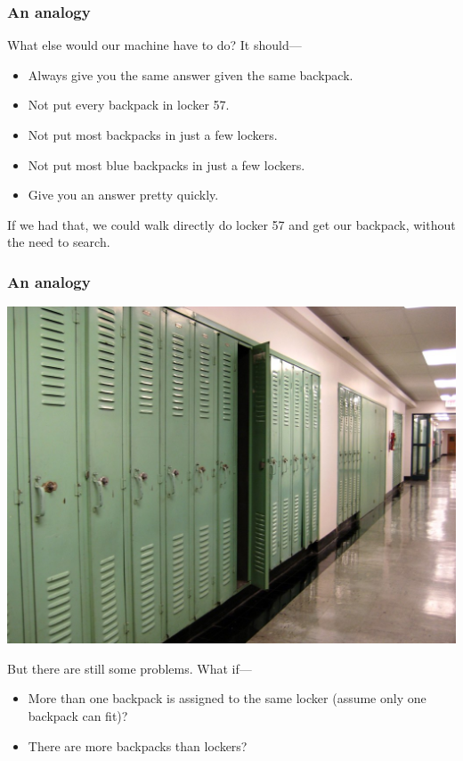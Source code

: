 \documentclass[aspectratio=169]{beamer}
\begin{document}
\begin{frame}
    \frametitle{An analogy}

    What else would our machine have to do? It should---

    \begin{itemize}
        \item Always give you the same answer given the same backpack.
        \item Not put every backpack in locker 57.
        \item Not put most backpacks in just a few lockers.
        \item Not put most blue backpacks in just a few lockers.
        \item Give you an answer pretty quickly.
    \end{itemize}

    \vspace{1em}

    If we had that, we could walk directly do locker 57 and get our backpack,
    without the need to search.
\end{frame}

\begin{frame}
    \frametitle{An analogy}
    \begin{center}
        \includegraphics[width=0.5\textheight]{lockers.jpg}
    \end{center}

    But there are still some problems. What if---

    \begin{itemize}
        \item More than one backpack is assigned to the same locker (assume
              only one backpack can fit)?
        \item There are more backpacks than lockers?
    \end{itemize}
\end{frame}
\end{document}
